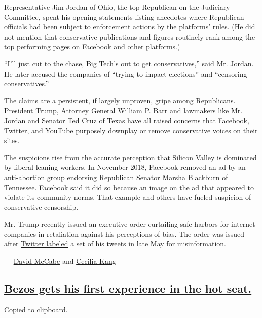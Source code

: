 Representative Jim Jordan of Ohio, the top Republican on the Judiciary
Committee, spent his opening statements listing anecdotes where
Republican officials had been subject to enforcement actions by the
platforms' rules. (He did not mention that conservative publications and
figures routinely rank among the top performing pages on Facebook and
other platforms.)

``I'll just cut to the chase, Big Tech's out to get conservatives,''
said Mr. Jordan. He later accused the companies of ``trying to impact
elections'' and ``censoring conservatives.''

The claims are a persistent, if largely unproven, gripe among
Republicans. President Trump, Attorney General William P. Barr and
lawmakers like Mr. Jordan and Senator Ted Cruz of Texas have all raised
concerns that Facebook, Twitter, and YouTube purposely downplay or
remove conservative voices on their sites.

The suspicions rise from the accurate perception that Silicon Valley is
dominated by liberal-leaning workers. In November 2018, Facebook removed
an ad by an anti-abortion group endorsing Republican Senator Marsha
Blackburn of Tennessee. Facebook said it did so because an image on the
ad that appeared to violate its community norms. That example and others
have fueled suspicion of conservative censorship.

Mr. Trump recently issued an executive order curtailing safe harbors for
internet companies in retaliation against his perceptions of bias. The
order was issued after
\href{https://slack-redir.net/link?url=https\%3A\%2F\%2Fwww.nytimes3xbfgragh.onion\%2F2020\%2F05\%2F26\%2Ftechnology\%2Ftwitter-trump-mail-in-ballots.html}{Twitter
labeled} a set of his tweets in late May for misinformation.

--- \href{https://www.nytimes3xbfgragh.onion/by/david-mccabe}{David
McCabe} and
\href{https://www.nytimes3xbfgragh.onion/by/cecilia-kang}{Cecilia Kang}

\hypertarget{bezos-gets-his-first-experience-in-the-hot-seat}{%
\subsection{\texorpdfstring{\protect\hyperlink{bezos-gets-his-first-experience-in-the-hot-seat}{Bezos
gets his first experience in the hot
seat.}}{Bezos gets his first experience in the hot seat.}}\label{bezos-gets-his-first-experience-in-the-hot-seat}}

Copied to clipboard.

